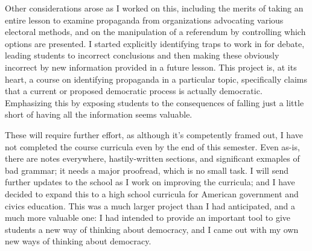 Other considerations arose as I worked on this, including the merits of taking an entire lesson to examine propaganda from organizations advocating various electoral methods, and on the manipulation of a referendum by controlling which options are presented.  I started explicitly identifying traps to work in for debate, leading students to incorrect conclusions and then making these obviously incorrect by new information provided in a future lesson.  This project is, at its heart, a course on identifying propaganda in a particular topic, specifically claims that a current or proposed democratic process is actually democratic.  Emphasizing this by exposing students to the consequences of falling just a little short of having all the information seems valuable.

These will require further effort, as although it's competently framed out, I have not completed the course curricula even by the end of this semester.  Even as-is, there are notes everywhere, hastily-written sections, and significant exmaples of bad grammar; it needs a major proofread, which is no small task.  I will send further updates to the school as I work on improving the curricula; and I have decided to expand this to a high school curricula for American government and civics education.  This was a much larger project than I had anticipated, and a much more valuable one:  I had intended to provide an important tool to give students a new way of thinking about democracy, and I came out with my own new ways of thinking about democracy.
